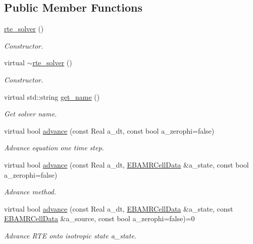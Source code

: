 \subsection*{Public Member Functions}
\begin{DoxyCompactItemize}
\item 
\hyperlink{classrte__solver_addf0d30585fa187b6f95e8070e07660b}{rte\+\_\+solver} ()
\begin{DoxyCompactList}\small\item\em Constructor. \end{DoxyCompactList}\item 
virtual \hyperlink{classrte__solver_a72c639dd6494bb99d3085272ce8bd1f7}{$\sim$rte\+\_\+solver} ()
\begin{DoxyCompactList}\small\item\em Constructor. \end{DoxyCompactList}\item 
virtual std\+::string \hyperlink{classrte__solver_a2c9a338bee0708080568aa0e43cd3738}{get\+\_\+name} ()
\begin{DoxyCompactList}\small\item\em Get solver name. \end{DoxyCompactList}\item 
virtual bool \hyperlink{classrte__solver_a6e064bf8ce5339137cfd74e3610f5b70}{advance} (const Real a\+\_\+dt, const bool a\+\_\+zerophi=false)
\begin{DoxyCompactList}\small\item\em Advance equation one time step. \end{DoxyCompactList}\item 
virtual bool \hyperlink{classrte__solver_adf0731e61e6e23e3f31d2ae511124e47}{advance} (const Real a\+\_\+dt, \hyperlink{type__definitions_8H_a7e610f301989e5e07781c5e338bdb7c3}{E\+B\+A\+M\+R\+Cell\+Data} \&a\+\_\+state, const bool a\+\_\+zerophi=false)
\begin{DoxyCompactList}\small\item\em Advance method. \end{DoxyCompactList}\item 
virtual bool \hyperlink{classrte__solver_a37c1915c42384c89ae8f1d0b805e6c59}{advance} (const Real a\+\_\+dt, \hyperlink{type__definitions_8H_a7e610f301989e5e07781c5e338bdb7c3}{E\+B\+A\+M\+R\+Cell\+Data} \&a\+\_\+state, const \hyperlink{type__definitions_8H_a7e610f301989e5e07781c5e338bdb7c3}{E\+B\+A\+M\+R\+Cell\+Data} \&a\+\_\+source, const bool a\+\_\+zerophi=false)=0
\begin{DoxyCompactList}\small\item\em Advance R\+TE onto isotropic state a\+\_\+state. \end{DoxyCompactList}\item 

\end{DoxyCompactItemize}
